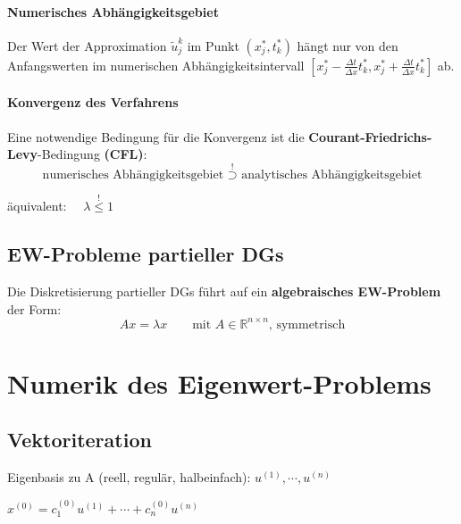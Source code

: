 		\paragraph{Numerisches Abhängigkeitsgebiet}
			Der Wert der Approximation $\tilde u_j^k$ im Punkt $(x_j^*,t_k^*)$ hängt nur von den Anfangswerten im numerischen Abhängigkeitsintervall $\left[ x_j^* - \frac{\Delta t}{\Delta x}t_k^*, x_j^* + \frac{\Delta t}{\Delta x}t_k^*\right]$ ab.

		\paragraph{Konvergenz des Verfahrens}
			Eine notwendige Bedingung für die Konvergenz ist die \textbf{Courant-Friedrichs-Levy}-Bedingung \textbf{(CFL)}:
			\[
				\text{numerisches Abhängigkeitsgebiet } \overset{!}{\supset} \text{ analytisches Abhängigkeitsgebiet}
			\]

			äquivalent: $\quad \lambda \overset{!}{\leq} 1$

	\subsection{EW-Probleme partieller DGs}
		Die Diskretisierung partieller DGs führt auf ein \textbf{algebraisches EW-Problem} der Form:
		\[
			Ax = \lambda x \qquad \text{mit } A \in \mathbb{R}^{n \times n}\text{, symmetrisch}
		\]

\section{Numerik des Eigenwert-Problems}
	\subsection{Vektoriteration}
		\begin{tightitemize}
			\item Eigenbasis zu A (reell, regulär, halbeinfach): $u^{(1)}, \cdots , u^{(n)}$
			\item $x^{(0)}=c_1^{(0)}u^{(1)} + \cdots + c_n^{(0)}u^{(n)}$
		\end{tightitemize}

